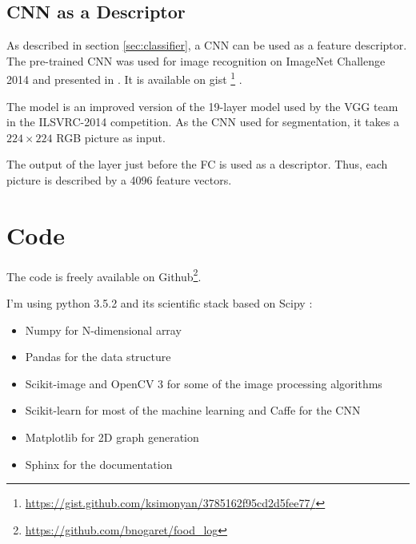 \subsection{CNN as a Descriptor}

As described in section \ref{sec:classifier}, a CNN can be used as a feature descriptor. The pre-trained CNN was used for image recognition on ImageNet Challenge 2014 and presented in  \cite{Simonyan2014}. It is available on gist  \footnote{\url{https://gist.github.com/ksimonyan/3785162f95cd2d5fee77/}} .

The model is an improved version of the 19-layer model used by the VGG team in the ILSVRC-2014 competition. As the CNN used for segmentation, it takes a $224 \times 224$ RGB picture as input.

The output of the layer just before the FC is used as a descriptor. Thus, each picture is described by a 4096 feature vectors.

\section{Code}

The code is freely available on Github\footnote{\url{https://github.com/bnogaret/food_log}}.

I'm using python 3.5.2 and its scientific stack based on Scipy \cite{Oliphant2007}:
\begin{itemize}
    \item Numpy \cite{VanDerWalt2011} for N-dimensional array
    \item Pandas \cite{McKinney2010} for the data structure
    \item Scikit-image \cite{VanderWalt2014} and OpenCV 3 \cite{Bradski2000} for some of the image processing algorithms
    \item Scikit-learn \cite{Pedregosa2012} for most of the machine learning and Caffe \cite{Jia2014a}  for the CNN
    \item Matplotlib \cite{Hunter2007} for 2D graph generation
    \item Sphinx for the documentation
\end{itemize}
